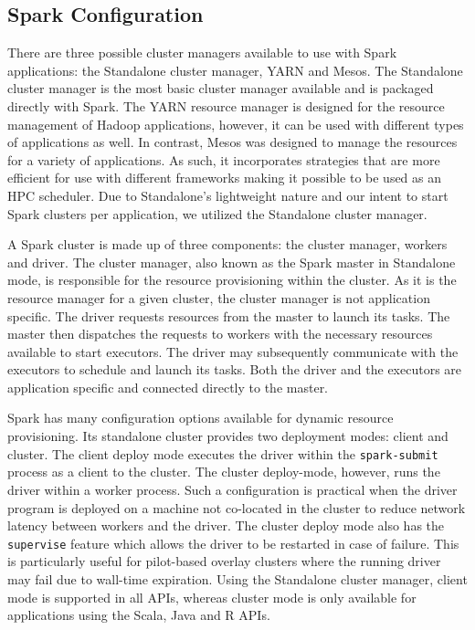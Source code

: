 	\subsection{Spark Configuration}
    
	There are three possible cluster managers available to use with Spark
	applications: the Standalone cluster manager, YARN and Mesos. The
	Standalone cluster manager is the most basic cluster manager available
	and is packaged directly with Spark. The YARN resource manager is
	designed for the resource management of Hadoop applications, however, it
	can be used with different types of applications as well. In contrast,
	Mesos was designed to manage the resources for a variety of
	applications. As such, it incorporates strategies that are more
	efficient for use with different frameworks making it possible to be
	used as an HPC scheduler. Due to Standalone's lightweight nature and our
	intent to start Spark clusters per application, we utilized the
	Standalone cluster manager.
    
	A Spark cluster is made up of three components: the cluster manager,
	workers and driver. The cluster manager, also known as the Spark master
	in Standalone mode, is responsible for the resource provisioning within
	the cluster.  As it is the resource manager for a given cluster, the
	cluster manager is not application specific. The driver requests
	resources from the master to launch its tasks. The master then
	dispatches the requests to workers with the necessary resources
	available to start executors. The driver may subsequently communicate
	with the executors to schedule and launch its tasks. Both the driver and
	the executors are application specific and connected directly to the
	master. 
    
	Spark has many configuration options available for dynamic resource
	provisioning. Its standalone cluster provides two deployment modes:
	client and cluster. The client deploy mode executes the driver within
	the \texttt{spark-submit} process as a client to the cluster. The
	cluster deploy-mode, however, runs the driver within a worker process.
	Such a configuration is practical when the driver program is deployed on
	a machine not co-located in the cluster to reduce network latency
	between workers and the driver. The cluster deploy mode also has the
	\texttt{supervise} feature which allows the driver to be restarted in
	case of failure. This is particularly useful for pilot-based overlay
	clusters where the running driver may fail due to wall-time expiration.
	Using the Standalone cluster manager, client mode is supported in all
	APIs, whereas cluster mode is only available for applications using the
	Scala, Java and R APIs.
    
